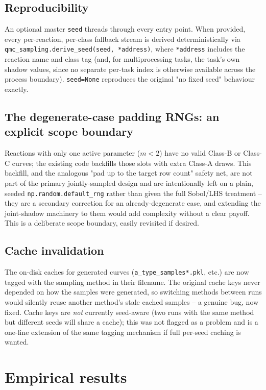 \documentclass[11pt]{article}
\newcommand{\code}[1]{\texttt{#1}}
\begin{document}
\subsection{Reproducibility}

An optional master \code{seed} threads through every entry point. When provided, every per-reaction, per-class fallback stream is derived deterministically via \code{qmc\_sampling.derive\_seed(seed, *address)}, where \code{*address} includes the reaction name and class tag (and, for multiprocessing tasks, the task's own shadow values, since no separate per-task index is otherwise available across the process boundary). \code{seed=None} reproduces the original "no fixed seed" behaviour exactly.

\subsection{The degenerate-case padding RNGs: an explicit scope boundary}

Reactions with only one active parameter ($m<2$) have no valid Class-B or Class-C curves; the existing code backfills those slots with extra Class-A draws. This backfill, and the analogous "pad up to the target row count" safety net, are not part of the primary jointly-sampled design and are intentionally left on a plain, seeded \code{np.random.default\_rng} rather than given the full Sobol/LHS treatment -- they are a secondary correction for an already-degenerate case, and extending the joint-shadow machinery to them would add complexity without a clear payoff. This is a deliberate scope boundary, easily revisited if desired.

\subsection{Cache invalidation}

The on-disk caches for generated curves (\code{a\_type\_samples*.pkl}, etc.) are now tagged with the sampling method in their filename. The original cache keys never depended on how the samples were generated, so switching methods between runs would silently reuse another method's stale cached samples -- a genuine bug, now fixed. Cache keys are \emph{not} currently seed-aware (two runs with the same method but different seeds will share a cache); this was not flagged as a problem and is a one-line extension of the same tagging mechanism if full per-seed caching is wanted.

\section{Empirical results}
\end{document}
